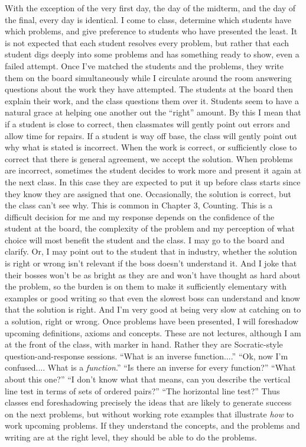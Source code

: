 \begin{annotation}
With the exception of the very first day, the day of the midterm, and the day of the final, every day is identical.  I come to class, determine which students have which problems, and give preference to students who have presented the least.   It is not expected that each student resolves every problem, but rather that each student digs deeply into some problems and has something ready to show, even a failed attempt. Once I've matched the students and the problems, they write them on the board simultaneously while I circulate around the room answering questions about the work they have attempted. The students at the board then explain their work, and the class questions them over it.   Students seem to have a natural grace at helping one another out the ``right'' amount.  By this I mean that if a student is close to correct, then classmates will gently point out errors and allow time for repairs.   If a student is way off base, the class will gently point out why what is stated is incorrect. When the work is correct, or sufficiently close to correct that there is general agreement, we accept the solution. When problems are incorrect, sometimes the student decides to work more and present it again at the next class.  In this case they are expected to put it up before class  starts since they know they are assigned that one. Occasionally, the solution is correct, but the class can't see why. This is common in Chapter 3, Counting.  This is a difficult decision for me and my response depends on the confidence of the student at the board, the complexity of the problem and my perception of what choice will most benefit the student and the class.  I may go to the board and clarify.  Or, I may point out to the student that in industry, whether the solution is right or wrong isn't relevant if the boss doesn't understand it.  And I joke that their bosses won't be as bright as they are and won't have thought as hard about the problem, so the burden is on them to make it sufficiently elementary with examples or good writing so that even the slowest boss can understand and know that the solution is right.  And I'm very good at being very slow at catching on to a solution, right or wrong.    Once problems have been presented, I will foreshadow upcoming definitions, axioms and concepts.  These are not lectures, although I am at the front of the class, with marker in hand.   Rather they are Socratic-style question-and-response sessions.   ``What is an inverse function....''  ``Ok, now I'm confused.... What is a \emph{function}.'' ``Is there an inverse for every function?''  ``What about this one?''  ``I don't know what that means, can you describe the vertical line test in terms of sets of ordered pairs?''  ``The horizontal line test?''   Thus classes end foreshadowing precisely the ideas that are likely to generate success on the next problems, but without working rote examples that illustrate \emph{how} to work upcoming problems.  If they understand the concepts, and the problems and writing are at the right level, they should be able to do the problems.


\end{annotation}
